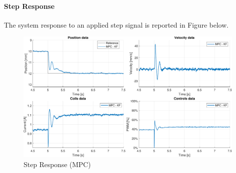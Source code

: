 \paragraph{Step Response} The system response to an applied step signal is reported in Figure below.

\begin{figure}[H]
    \centering
    \includegraphics[width=1\linewidth]{./img/MATLAB/results/step_MPC_KF.pdf}
    \caption{Step Response (MPC)}
    \label{fig:step_MPC}
\end{figure}
